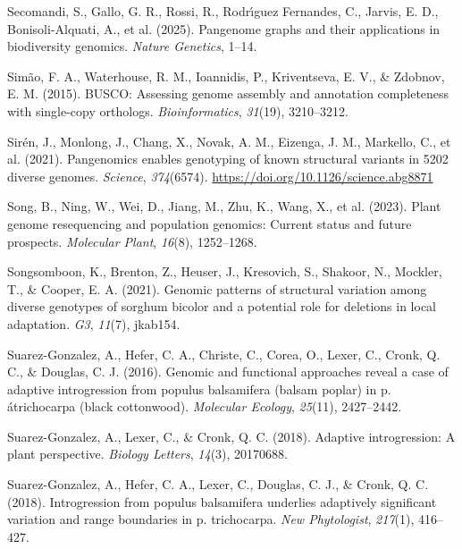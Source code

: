 \documentclass[
]{agujournal2019}
\newlength{\cslhangindent}
\newenvironment{CSLReferences}[2] %
 {\begin{list}{}{%
  \setlength{\itemindent}{0pt}
  \setlength{\leftmargin}{0pt}
  \setlength{\parsep}{0pt}
  \ifodd #1
   \setlength{\leftmargin}{\cslhangindent}
   \setlength{\itemindent}{-1\cslhangindent}
  \fi
  \setlength{\itemsep}{#2\baselineskip}}}
 {\end{list}}
\begin{document}
\begin{CSLReferences}{1}{0}
Secomandi, S., Gallo, G. R., Rossi, R., Rodrı́guez Fernandes, C., Jarvis,
E. D., Bonisoli-Alquati, A., et al. (2025). Pangenome graphs and their
applications in biodiversity genomics. \emph{Nature Genetics}, 1--14.

Simão, F. A., Waterhouse, R. M., Ioannidis, P., Kriventseva, E. V., \&
Zdobnov, E. M. (2015). BUSCO: Assessing genome assembly and annotation
completeness with single-copy orthologs. \emph{Bioinformatics},
\emph{31}(19), 3210--3212.

Sirén, J., Monlong, J., Chang, X., Novak, A. M., Eizenga, J. M.,
Markello, C., et al. (2021). Pangenomics enables genotyping of known
structural variants in 5202 diverse genomes. \emph{Science},
\emph{374}(6574). \url{https://doi.org/10.1126/science.abg8871}

Song, B., Ning, W., Wei, D., Jiang, M., Zhu, K., Wang, X., et al.
(2023). Plant genome resequencing and population genomics: Current
status and future prospects. \emph{Molecular Plant}, \emph{16}(8),
1252--1268.

Songsomboon, K., Brenton, Z., Heuser, J., Kresovich, S., Shakoor, N.,
Mockler, T., \& Cooper, E. A. (2021). Genomic patterns of structural
variation among diverse genotypes of sorghum bicolor and a potential
role for deletions in local adaptation. \emph{G3}, \emph{11}(7),
jkab154.

Suarez-Gonzalez, A., Hefer, C. A., Christe, C., Corea, O., Lexer, C.,
Cronk, Q. C., \& Douglas, C. J. (2016). Genomic and functional
approaches reveal a case of adaptive introgression from populus
balsamifera (balsam poplar) in p. {á}trichocarpa (black cottonwood).
\emph{Molecular Ecology}, \emph{25}(11), 2427--2442.

Suarez-Gonzalez, A., Lexer, C., \& Cronk, Q. C. (2018). Adaptive
introgression: A plant perspective. \emph{Biology Letters},
\emph{14}(3), 20170688.

Suarez-Gonzalez, A., Hefer, C. A., Lexer, C., Douglas, C. J., \& Cronk,
Q. C. (2018). Introgression from populus balsamifera underlies
adaptively significant variation and range boundaries in p. trichocarpa.
\emph{New Phytologist}, \emph{217}(1), 416--427.


\end{CSLReferences}
\end{document}
